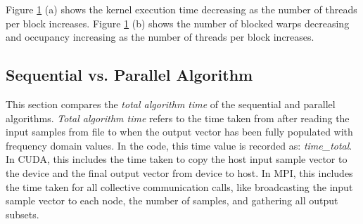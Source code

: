 \documentclass[11pt,a4paper]{article}
\begin{document}
\begin{figure}[H]%
    \centering
    \qquad
    \vspace{5pt}
    \caption{}%
    \label{fig:cuda_threads_per_block}%
\end{figure}

Figure \ref{fig:cuda_threads_per_block} (a) shows the kernel execution time decreasing as the number of threads per block increases. Figure \ref{fig:cuda_threads_per_block} (b) shows the number of blocked warps decreasing and occupancy increasing as the number of threads per block increases.


\subsection{Sequential vs. Parallel Algorithm}
This section compares the \textit{total algorithm time} of the sequential and parallel algorithms. \textit{Total algorithm time} refers to the time taken from after reading the input samples from file to when the output vector has been fully populated with frequency domain values. In the code, this time value is recorded as: \textit{time\_total}. In CUDA, this includes the time taken to copy the host input sample vector to the device and the final output vector from device to host. In MPI, this includes the time taken for all collective communication calls, like broadcasting the input sample vector to each node, the number of samples, and gathering all output subsets.
\end{document}
